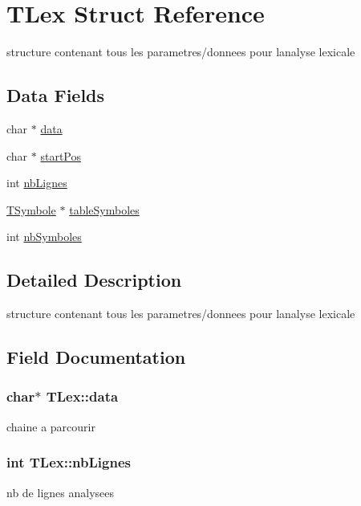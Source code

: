\hypertarget{structTLex}{}\section{T\+Lex Struct Reference}
\label{structTLex}


structure contenant tous les parametres/donnees pour l\textquotesingle{}analyse lexicale  


\subsection*{Data Fields}
\begin{DoxyCompactItemize}
\item 
char $\ast$ \hyperlink{structTLex_a2242e630c3f871659c3e36b101b504b4}{data}
\item 
char $\ast$ \hyperlink{structTLex_a1122e1ced17c2c07f7975b4f11110ad8}{start\+Pos}
\item 
int \hyperlink{structTLex_a74499b75b25dc1bce1fb2f66af6ce1e2}{nb\+Lignes}
\item 
\hyperlink{structTSymbole}{T\+Symbole} $\ast$ \hyperlink{structTLex_a31a6c4fc0839643e3251a372ba7adf04}{table\+Symboles}
\item 
int \hyperlink{structTLex_a84d0d3a30f4b42f8db675f8cbb60373f}{nb\+Symboles}
\end{DoxyCompactItemize}


\subsection{Detailed Description}
structure contenant tous les parametres/donnees pour l\textquotesingle{}analyse lexicale 

\subsection{Field Documentation}
\subsubsection[{\texorpdfstring{data}{data}}]{\setlength{\rightskip}{0pt plus 5cm}char$\ast$ T\+Lex\+::data}\hypertarget{structTLex_a2242e630c3f871659c3e36b101b504b4}{}\label{structTLex_a2242e630c3f871659c3e36b101b504b4}
chaine a parcourir 
\subsubsection[{\texorpdfstring{nb\+Lignes}{nbLignes}}]{\setlength{\rightskip}{0pt plus 5cm}int T\+Lex\+::nb\+Lignes}\hypertarget{structTLex_a74499b75b25dc1bce1fb2f66af6ce1e2}{}\label{structTLex_a74499b75b25dc1bce1fb2f66af6ce1e2}
nb de lignes analysees 
